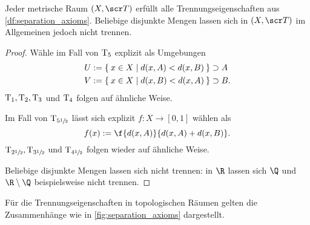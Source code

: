 \begin{nt}
	Jeder metrische Raum $(X, \scr T)$ erfüllt alle Trennungseigenschaften aus \ref{df:separation_axioms}.
	Beliebige disjunkte Mengen lassen sich in $(X, \scr T)$ im Allgemeinen jedoch nicht trennen.
	\begin{proof}
		Wähle im Fall von $\mathrm{T_{5}}$ explizit als Umgebungen
		\begin{align*}
			U &:= \Set{ x \in X | d(x, A) < d(x, B) } \supset A \\
			V &:= \Set{ x \in X | d(x, B) < d(x, A) } \supset B.
		\end{align*}
		$\mathrm{T_{1}}, \mathrm{T_{2}}, \mathrm{T_{3}}$ und $\mathrm{T_{4}}$ folgen auf ähnliche Weise.

		Im Fall von $\mathrm{T_{5\sfrac12}}$ lässt sich explizit $f: X \to [0,1]$ wählen als
		\[
			f(x)
			:= \f {d(x,A)}{d(x,A) + d(x,B)}.
		\]
		$\mathrm{T_{2\sfrac12}}, \mathrm{T_{3\sfrac12}}$ und $\mathrm{T_{4\sfrac12}}$ folgen wieder auf ähnliche Weise.

		Beliebige disjunkte Mengen lassen sich nicht trennen:
		in $\R$ lassen sich $\Q$ und $\R \setminus \Q$ beispielsweise nicht trennen.
	\end{proof}
\end{nt}

Für die Trennungseigenschaften in topologischen Räumen gelten die Zusammenhänge wie in \ref{fig:separation_axioms} dargestellt.

